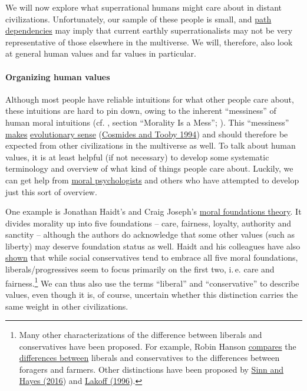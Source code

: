 We will now explore what superrational humans might care about in
distant civilizations. Unfortunately, our sample of these people is
small, and
\href{https://en.wikipedia.org/wiki/Path_dependence}{path
dependencies} may imply that current earthly superrationalists may not
be very representative of those elsewhere in the multiverse. We will,
therefore, also look at general human values and far values in
particular.

\hypertarget{organizing-human-values}{\paragraph{Organizing human
values}\label{organizing-human-values}}

Although most people have reliable intuitions for what other people care
about, these intuitions are hard to pin down, owing to the inherent
``messiness'' of human moral intuitions (cf.
\citet{Stewart-Williams2015-gg}, section ``Morality Is a
Mess''; \cite[chapters 3--5.3]{Muehlhauser2012-ib}). This ``messiness''
\href{http://lesswrong.com/lw/l3/thou_art_godshatter/}{makes}
\href{https://en.wikipedia.org/wiki/Modularity_of_mind\#Evolutionary_psychology_and_massive_modularity}{evolutionary
sense}
(\href{http://citeseerx.ist.psu.edu/viewdoc/download?doi=10.1.1.140.7758\&rep=rep1\&type=pdf}{Cosmides
and Tooby 1994}) and should therefore be expected from other
civilizations in the multiverse as well. To talk about human values, it
is at least helpful (if not necessary) to develop some systematic
terminology and overview of what kind of things people care about.
Luckily, we can get help from
\href{https://en.wikipedia.org/wiki/Moral_psychology}{moral
psychologists} and others who have attempted to develop just this sort
of overview.

One example is Jonathan Haidt's and Craig Joseph's
\href{https://en.wikipedia.org/wiki/Moral_foundations_theory}{moral
foundations theory}. It divides morality up into five foundations --
care, fairness, loyalty, authority and sanctity -- although the authors
do acknowledge that some other values (such as liberty) may deserve
foundation status as well. Haidt and his colleagues have also
\href{https://en.wikipedia.org/wiki/Moral_foundations_theory\#Political_ideology}{shown}
that while social conservatives tend to embrace all five moral
foundations, liberals/progressives seem to focus primarily on the first
two, i.\,e. care and fairness.\footnote{Many other characterizations of
  the difference between liberals and conservatives have been proposed.
  For example, Robin Hanson
  \href{http://www.overcomingbias.com/2012/05/forager-vs-farmer-morality.html}{compares}
  the
  \href{http://www.overcomingbias.com/2010/10/two-types-of-people.html}{differences
  between} liberals and conservatives to the differences between
  foragers and farmers. Other distinctions have been proposed by
  \href{https://sl4librarian.files.wordpress.com/2017/01/sinn2016-replacing-the-moral-foundations.pdf}{Sinn
  and Hayes (2016}) and
  \href{https://en.wikipedia.org/wiki/Moral_Politics_(book)}{Lakoff
  (1996}).} We can thus also use the terms ``liberal'' and
``conservative'' to describe values, even though it is, of course,
uncertain whether this distinction carries the same weight in other
civilizations.

